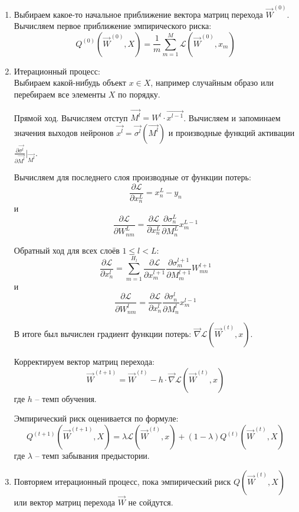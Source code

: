 \begin{enumerate}
	\item Выбираем какое-то начальное приближение вектора матриц перехода $\overrightarrow{W}^{(0)}$. Вычисляем первое приближение эмпирического риска:
	$$
	Q^{(0)}(\overrightarrow{W}^{(0)}, X) = \frac{1}{m} \sum\limits_{m = 1}^{M} \mathcal{L} (\overrightarrow{W}^{(0)}, x_m)
	$$
	
	\item Итерационный процесс: \\
	Выбираем какой-нибудь объект $x \in X$, например случайным образо или перебираем все элементы $X$ по порядку.
	
	Прямой ход. Вычисляем отступ $\overrightarrow{M^l} = W^l \cdot \overrightarrow{x^{l-1}}$.
	Вычисляем и запоминаем значения выходов нейронов $\overrightarrow{x^l} = \overrightarrow{\sigma^l}(\overrightarrow{M^l})$ и производные функций активации $\frac{\partial \overrightarrow{\sigma^l}}{\partial \overrightarrow{M^l}}\Big|_{\overrightarrow{M^l}}$.
	
	Вычисляем для последнего слоя производные от функции потерь:
	$$
	\frac{\partial \mathcal{L}}{\partial x^L_n} = x^L_n - y_n
	$$
	и
	$$
	\frac{\partial \mathcal{L}}{\partial W^L_{nm}} = \frac{\partial \mathcal{L}}{\partial x^L_n} \frac{\partial \sigma^L_n}{\partial M^L_n} x^{L-1}_{m}
	$$
	
	Обратный ход для всех слоёв $1 \le l < L$:
	$$
	\frac{\partial \mathcal{L}}{\partial x^{l}_n} = \sum\limits_{m = 1}^{H_l} \frac{\partial \mathcal{L}}{\partial x^{l+1}_m} \frac{\partial \sigma^{l+1}_m}{\partial M^{l+1}_m} W^{l+1}_{mn}
	$$
	и
	$$
	\frac{\partial \mathcal{L}}{\partial W^{l}_{nm}} = \frac{\partial \mathcal{L}}{\partial x^{l}_n} \frac{\partial \sigma^{l}_n}{\partial M^{l}_n} x^{l-1}_{m}
	$$
	
	В итоге был вычислен градиент функции потерь: $\overrightarrow{\nabla} \mathcal{L} (\overrightarrow{W}^{(t)}, x)$.
	
	Корректируем вектор матриц перехода:
	$$
	\overrightarrow{W}^{(t+1)} = \overrightarrow{W}^{(t)} - h \cdot \overrightarrow{\nabla} \mathcal{L} (\overrightarrow{W}^{(t)}, x)
	$$
	где $h$ -- темп обучения.
	
	Эмпирический риск оценивается по формуле:
	$$
	Q^{(t+1)}(\overrightarrow{W}^{(t+1)}, X) = \lambda \mathcal{L} (\overrightarrow{W}^{(t)}, x) + (1-\lambda)  Q^{(t)}(\overrightarrow{W}^{(t)}, X)
	$$
	где $\lambda$ -- темп забывания предыстории.
	
	\item Повторяем итерационный процесс, пока эмпирический риск $Q(\overrightarrow{W}^{(t)}, X)$ или вектор матриц перехода $\overrightarrow{W}$ не сойдутся.
\end{enumerate}


